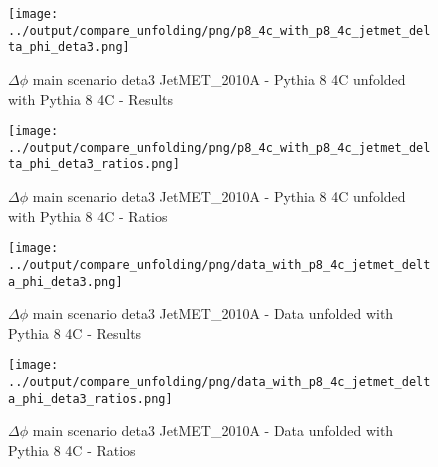 \documentclass[11pt]{book}
\begin{document}
\begin{figure}[ht]
\centering
\texttt{[image: ../output/compare\_unfolding/png/p8\_4c\_with\_p8\_4c\_jetmet\_delta\_phi\_deta3.png]}
\caption{$\Delta\phi$ main scenario deta3 JetMET\_2010A - Pythia 8 4C unfolded with Pythia 8 4C - Results}
\label{p8_p8_jetmet_delta_phi_deta3_a}
\end{figure}

\begin{figure}[ht]
\centering
\texttt{[image: ../output/compare\_unfolding/png/p8\_4c\_with\_p8\_4c\_jetmet\_delta\_phi\_deta3\_ratios.png]}
\caption{$\Delta\phi$ main scenario deta3 JetMET\_2010A - Pythia 8 4C unfolded with Pythia 8 4C - Ratios}
\label{p8_p8_jetmet_delta_phi_deta3_b}
\end{figure}

\begin{comment}

\begin{figure}[ht]
\centering
\texttt{[image: ../output/compare\_unfolding/png/p6\_z2\_with\_p8\_4c\_jetmet\_delta\_phi\_deta3.png]}
\caption{$\Delta\phi$ main scenario deta3 JetMET\_2010A - Pythia 6 Z2* unfolded with Pythia 8 4C - Results}
\label{p6_p8_jetmet_delta_phi_deta3_a}
\end{figure}

\begin{figure}[ht]
\centering
\texttt{[image: ../output/compare\_unfolding/png/p6\_z2\_with\_p8\_4c\_jetmet\_delta\_phi\_deta3\_ratios.png]}
\caption{$\Delta\phi$ main scenario deta3 JetMET\_2010A - Pythia 6 Z2* unfolded with Pythia 8 4C - Ratios}
\label{p6_p8_jetmet_delta_phi_deta3_b}
\end{figure}

\end{comment}

\begin{figure}[ht]
\centering
\texttt{[image: ../output/compare\_unfolding/png/data\_with\_p8\_4c\_jetmet\_delta\_phi\_deta3.png]}
\caption{$\Delta\phi$ main scenario deta3 JetMET\_2010A - Data unfolded with Pythia 8 4C - Results}
\label{data_p8_jetmet_delta_phi_deta3_a}
\end{figure}

\begin{figure}[ht]
\centering
\texttt{[image: ../output/compare\_unfolding/png/data\_with\_p8\_4c\_jetmet\_delta\_phi\_deta3\_ratios.png]}
\caption{$\Delta\phi$ main scenario deta3 JetMET\_2010A - Data unfolded with Pythia 8 4C - Ratios}
\label{data_p8_jetmet_delta_phi_deta3_b}
\end{figure}
\end{document}
